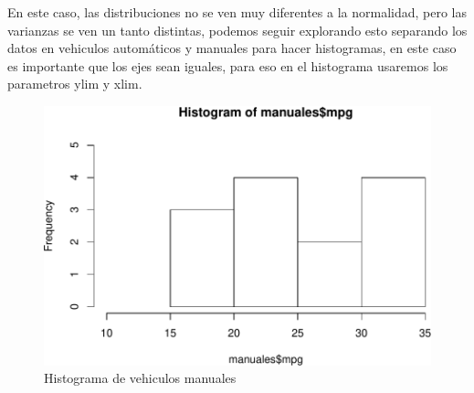 \documentclass[]{article}
\newenvironment{Shaded}{\begin{snugshade}}{\end{snugshade}}
\newcommand{\KeywordTok}[1]{\textcolor[rgb]{0.13,0.29,0.53}{\textbf{#1}}}
\newcommand{\DataTypeTok}[1]{\textcolor[rgb]{0.13,0.29,0.53}{#1}}
\newcommand{\DecValTok}[1]{\textcolor[rgb]{0.00,0.00,0.81}{#1}}
\newcommand{\StringTok}[1]{\textcolor[rgb]{0.31,0.60,0.02}{#1}}
\newcommand{\OperatorTok}[1]{\textcolor[rgb]{0.81,0.36,0.00}{\textbf{#1}}}
\newcommand{\NormalTok}[1]{#1}
\begin{document}
En este caso, las distribuciones no se ven muy diferentes a la
normalidad, pero las varianzas se ven un tanto distintas, podemos seguir
explorando esto separando los datos en vehiculos automáticos y manuales
para hacer histogramas, en este caso es importante que los ejes sean
iguales, para eso en el histograma usaremos los parametros ylim y xlim.

\begin{Shaded}
\end{Shaded}

\begin{figure}
\centering
\includegraphics{Guia5_files/figure-latex/unnamed-chunk-9-1.pdf}
\caption{Histograma de vehiculos manuales}
\end{figure}

\begin{Shaded}
\end{Shaded}
\end{document}
